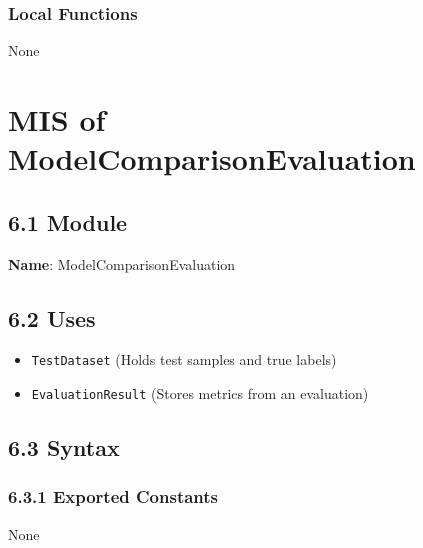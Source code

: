 \documentclass[12pt, titlepage]{article}
\begin{document}
  
  
  
  \subsubsection{Local Functions}

  None
   
  

\newpage
\section{MIS of ModelComparisonEvaluation}
\label{sec:ModelComparisonEvaluation}

\subsection{6.1 Module}
\textbf{Name}: ModelComparisonEvaluation

\subsection{6.2 Uses}
\begin{itemize}
    \item \texttt{TestDataset} (Holds test samples and true labels)
    \item \texttt{EvaluationResult} (Stores metrics from an evaluation)
\end{itemize}

\subsection{6.3 Syntax}

\subsubsection{6.3.1 Exported Constants}
None
\end{document}

